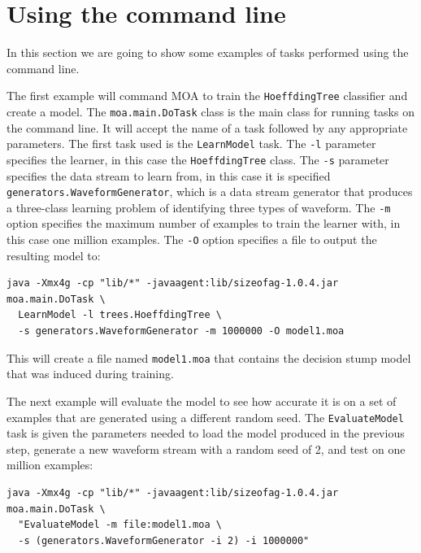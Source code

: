 \documentclass[a4paper,12pt,twoside]{book}
\begin{document}
\section{Using the command line}

In this section we are going to show some examples of tasks performed using the command line.

The first example will command MOA to train the \verb+HoeffdingTree+ classifier and create a model. The \verb+moa.main.DoTask+ class is the main class for running tasks on the command line. It will accept the name of a task followed by any appropriate parameters. The first task used is the \verb+LearnModel+ task. The \verb+-l+ parameter specifies the learner, in this case the \verb+HoeffdingTree+ class. The \verb+-s+ parameter specifies the data stream to learn from, in this case it is
specified  \verb+generators.WaveformGenerator+, which is a data stream generator that produces a three-class learning problem of identifying three types of waveform. The \verb+-m+ option specifies the maximum number of examples to train the learner with, in this case one million examples. The \verb+-O+ option specifies a file to output the resulting model to:

\begin{footnotesize}\begin{verbatim}
java -Xmx4g -cp "lib/*" -javaagent:lib/sizeofag-1.0.4.jar moa.main.DoTask \
  LearnModel -l trees.HoeffdingTree \
  -s generators.WaveformGenerator -m 1000000 -O model1.moa
\end{verbatim}\end{footnotesize}

This will create a file named \verb+model1.moa+ that contains the decision stump model that was induced during training.

The next example will evaluate the model to see how accurate it is on a set of examples that are generated using a different random seed. The \verb+EvaluateModel+ task is given the parameters needed to load the model produced in the previous step, generate a new waveform stream with a random seed of 2, and test on one million examples:

\begin{footnotesize}\begin{verbatim}
java -Xmx4g -cp "lib/*" -javaagent:lib/sizeofag-1.0.4.jar moa.main.DoTask \
  "EvaluateModel -m file:model1.moa \
  -s (generators.WaveformGenerator -i 2) -i 1000000"
\end{verbatim}\end{footnotesize}
\end{document}
